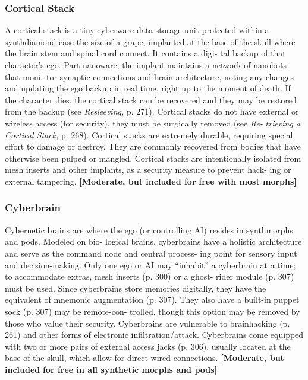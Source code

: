 \subsubsection{Cortical Stack}

A cortical stack is a tiny cyberware data storage unit 
protected within a synthdiamond case the size of a 
grape, implanted at the base of the skull where the 
brain stem and spinal cord connect. It contains a digi-
tal backup of that character's ego. Part nanoware, the 
implant maintains a network of nanobots that moni-
tor synaptic connections and brain architecture, noting 
any changes and updating the ego backup in real time, 
right up to the moment of death. If the character dies, 
the cortical stack can be recovered and they may be 
restored from the backup (see \textit{Resleeving,} p. 271). 
Cortical stacks do not have external or wireless access 
(for security), they must be surgically removed (see \textit{Re-}
\textit{trieving a Cortical Stack,} p. 268). Cortical stacks are 
extremely durable, requiring special effort to damage 
or destroy. They are commonly recovered from bodies 
that have otherwise been pulped or mangled. Cortical 
stacks are intentionally isolated from mesh inserts and 
other implants, as a security measure to prevent hack-
ing or external tampering. \textbf{[Moderate, but included for }
\textbf{free with most morphs]}

\subsubsection{Cyberbrain}

Cybernetic brains are where the ego (or controlling 
AI) resides in synthmorphs and pods. Modeled on bio-
logical brains, cyberbrains have a holistic architecture 
and serve as the command node and central process-
ing point for sensory input and decision-making. Only 
one ego or AI may ``inhabit'' a cyberbrain at a time; to 
accommodate extras, mesh inserts (p. 300) or a ghost-
rider module (p. 307) must be used. Since cyberbrains 
store memories digitally, they have the equivalent of 
mnemonic augmentation (p. 307). They also have 
a built-in puppet sock (p. 307) may be remote-con-
trolled, though this option may be removed by those
who value their security. Cyberbrains are vulnerable 
to brainhacking (p. 261) and other forms of electronic 
infiltration/attack. Cyberbrains come equipped with 
two or more pairs of external access jacks (p. 306), 
usually located at the base of the skull, which allow 
for direct wired connections. \textbf{[Moderate, but included }
\textbf{for free in all synthetic morphs and pods]}


